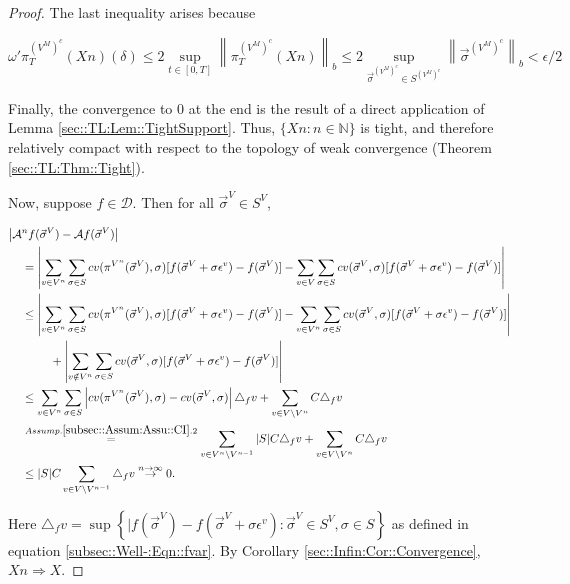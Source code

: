 \documentclass[12pt]{article}
\newcommand{\mb}{\mathbb}
\newcommand{\mc}{\mathcal}
\newcommand{\ra}{\rightarrow}
\newcommand{\os}{\overset}
\newcommand{\ep}{\epsilon}
\newcommand{\ind}{\hspace{24pt}}
\renewcommand{\v}{v}							%
\renewcommand{\S}{S}							%
\newcommand{\s}{\sigma}							%
\newcommand{\sv}{\vec{\s}}						%
\renewcommand{\b}{b}							%
\newcommand{\ev}{\ep}							%
\newcommand{\T}{T}								%
\renewcommand{\t}{t}							%
\newcommand{\proj}{\pi}							%
\newcommand{\X}{X}								%
\newcommand{\IG}{\mc{A}}						%
\newcommand{\IGr}{c}							%
\newcommand{\f}{f}								%
\newcommand{\vind}[1]{^{#1}}					%
\newcommand{\carp}[1]{^{#1}}					%
\newcommand{\vsi}[1]{^{#1}}						%
\newcommand{\cind}[1]{_{#1}}					%
\newcommand{\ts}[1]{_{#1}}						%
\newcommand{\const}{C}							%
\newcommand{\sln}[1]{^{#1}}						%
\newcommand{\core}{\mc{D}}						%
\newcommand{\delt}{\triangle}					%
\newcommand{\cconst}{M}							%
\newcommand{\cmodu}{\omega'}					%
\newcommand{\deltf}[1]{_{#1}}					%
\begin{document}
\begin{proof}
The last inequality arises because

\[\cmodu{\proj\vsi{\left(V\sln{\cconst}\right)^c}\ts{\T}(\X{}{}{n})}(\delta) \leq 2 \sup_{\t\in [0,\T]} \left\|\proj\vsi{\left(V\sln{\cconst}\right)^c}\ts{\T}(\X{}{}{n})\right\|_{\b} \leq 2 \sup_{\sv\cind{}\vsi{\left(V\sln{\cconst}\right)^c} \in \S\carp{\left(V\sln{\cconst}\right)^c}} \left\|\sv\cind{}\vsi{\left(V\sln{\cconst}\right)^c}\right\|_{\b} < \ep/2\]

Finally, the convergence to 0 at the end is the result of a direct application of Lemma \ref{sec::TL:Lem::TightSupport}. Thus, \(\{\X{}{}{n}:n\in \mb{N}\}\) is tight, and therefore relatively compact with respect to the topology of weak convergence (Theorem \ref{sec::TL:Thm::Tight}).

Now, suppose \(f\in \core\). Then for all \(\sv\cind{}\vsi{V} \in \S\carp{V}\),

\begin{align*}
\big|\IG&\sln{n}f(\sv\cind{}\vsi{V}) - \IG f(\sv\cind{}\vsi{V})\big|\\
&= \left|\sum_{\v \in V\sln{n}} \sum_{\s \in \S} \IGr{\v}(\proj\vsi{V\sln{n}}\ts{}(\sv\cind{}\vsi{V}),\s)[f(\sv\cind{}\vsi{V}+\s\ev\vind{\v}) - f(\sv\cind{}\vsi{V})] - \sum_{\v \in V}\sum_{\s \in \S} \IGr{\v}(\sv\cind{}\vsi{V},\s)[f(\sv\cind{}\vsi{V}+\s\ev\vind{\v}) - f(\sv\cind{}\vsi{V})]\right|\\
&\leq  \left|\sum_{\v \in V\sln{n}} \sum_{\s \in \S} \IGr{\v}(\proj\vsi{V\sln{n}}\ts{}(\sv\cind{}\vsi{V}),\s)[f(\sv\cind{}\vsi{V}+\s\ev\vind{\v}) - f(\sv\cind{}\vsi{V})] - \sum_{\v \in V\sln{n}}\sum_{\s \in \S} \IGr{\v}(\sv\cind{}\vsi{V},\s)[f(\sv\cind{}\vsi{V}+\s\ev\vind{\v}) - f(\sv\cind{}\vsi{V})]\right|\\
&\ind  +\left|\sum_{\v \notin V\sln{n}} \sum_{\s\in \S} \IGr{\v}(\sv\cind{}\vsi{V},\s)[f(\sv\cind{}\vsi{V}+\s\ev\vind{\v}) - f(\sv\cind{}\vsi{V})]\right|\\
&\leq \sum_{\v \in V\sln{n}}\sum_{\s \in \S} \left|\IGr{\v}(\proj\vsi{V\sln{n}}\ts{}(\sv\cind{}\vsi{V}),\s) - \IGr{\v}(\sv\cind{}\vsi{V},\s)\right|\delt\deltf{\f}{\v} + \sum_{\v \in V\setminus V\sln{n}} \const{}\delt\deltf{\f}{\v}\\
&\os{Assump. \ref{subsec::Assum:Assu::CI}.2}{=} \sum_{\v \in V\sln{n}\setminus V\sln{n-1}} |\S|\const{} \delt\deltf{\f}{\v} + \sum_{\v \in V\setminus V\sln{n}} \const{}\delt\deltf{\f}{\v}\\
&\leq |\S|C\sum_{\v \in V\setminus V\sln{n-1}} \delt\deltf{\f}{\v} \os{n\ra\infty}{\ra} 0.
\end{align*}

Here \(\delt\deltf{\f}{\v} = \sup\left\{|f(\sv\cind{}\vsi{V}) - f(\sv\cind{}\vsi{V} + \s\ev\vind{\v}): \sv\cind{}\vsi{V}\in \S\carp{V},\s \in \S\right\}\) as defined in equation \eqref{subsec::Well-:Eqn::fvar}. By Corollary \ref{sec::Infin:Cor::Convergence}, \(\X{}{}{n}\Rightarrow \X{}{}\).
\end{proof}
\end{document}
